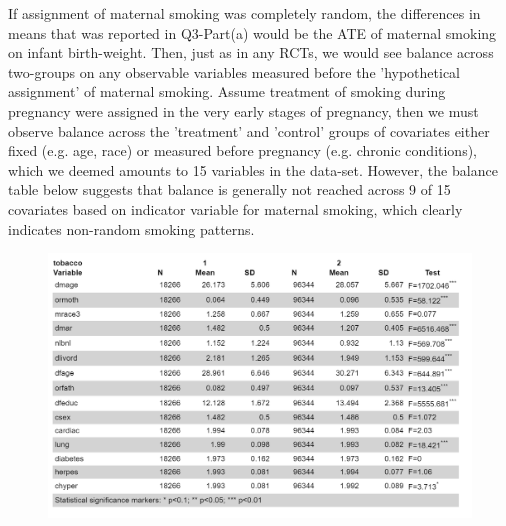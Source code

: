 \documentclass[12pt]{article}
\begin{document}
\vem
{}

If assignment of maternal smoking was completely random, the differences in means that was reported in Q3-Part(a) would be the ATE of maternal smoking on infant birth-weight. Then, just as in any RCTs, we would see balance across two-groups on any observable variables measured before the 'hypothetical assignment' of maternal smoking. Assume treatment of smoking during pregnancy were assigned in the very early stages of pregnancy, then we must observe balance across the 'treatment' and 'control' groups of covariates either fixed (e.g. age, race) or measured before pregnancy (e.g. chronic conditions), which we deemed amounts to 15 variables in the data-set. However, the balance table below suggests that balance is generally not reached across 9 of 15 covariates based on indicator variable for maternal smoking, which clearly indicates non-random smoking patterns.

\begin{figure}[h!tp]
    \centering
    \includegraphics[width=18cm]{3b_BalanceTable_R.png}
\end{figure}
\end{document}
